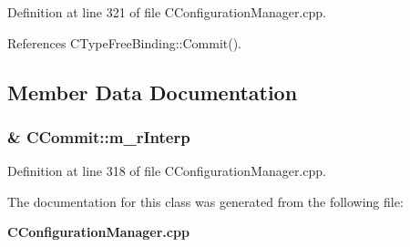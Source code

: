 Definition at line 321 of file CConfiguration\-Manager.cpp.

References CType\-Free\-Binding::Commit().

\subsection{Member Data Documentation}
\subsubsection{\& CCommit::m\_\-r\-Interp\hspace{0.3cm}{\tt  [private]}}\label{classCCommit_o0}




Definition at line 318 of file CConfiguration\-Manager.cpp.

The documentation for this class was generated from the following file:\begin{CompactItemize}
\item 
{\bf CConfiguration\-Manager.cpp}\end{CompactItemize}
